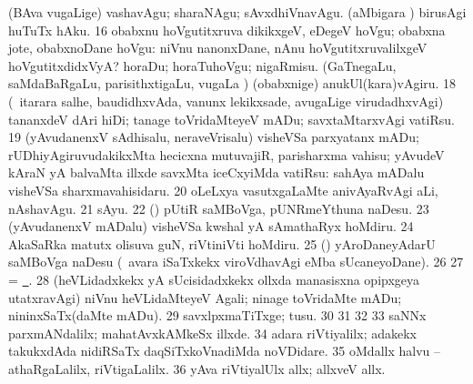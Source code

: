 { (BAva \mo vugaLige) vashavAgu; sharaNAgu; sAvxdhiVnavAgu. 
 (aMbigara \vi) birusAgi huTuTx hAku. 
\eanum
\numie
\num{16}  obabxnu hoVgutitxruva dikikxgeV, eDegeV hoVgu; obabxna jote, obabxnoDane hoVgu:  niVnu nanonxDane, nAnu hoVgutitxruvalilxgeV hoVgutitxdidxVyA? 
  
\banum
{} horaDu; horaTuhoVgu; nigaRmisu. 
 (GaTnegaLu, saMdaBaRgaLu, parisithxtigaLu, \mo vugaLa \vi) (obabxnige) anukUl(kara)vAgiru. 
\eanum
\numie
\num{18}  (\kanmu\ itarara salhe, baudidhxvAda, \mo vanunx lekikxsade, avugaLige virudadhxvAgi) tananxdeV dAri hiDi; tanage toVridaMteyeV mADu; savxtaMtarxvAgi vatiRsu. 
\num{19}  (yAvudanenxV sAdhisalu, neraveVrisalu) visheVSa parxyatanx mADu; rUDhiyAgiruvudakikxMta hecicxna mutuvajiR, parisharxma vahisu; yAvudeV kAraN yA balvaMta illxde savxMta iceCxyiMda vatiRsu:  sahAya mADalu visheVSa sharxmavahisidaru. 
\num{20}  oLeLxya vasutxgaLaMte anivAyaRvAgi aLi, nAshavAgu. 
\num{21}  sAyu. 
\num{22}  (\AmA) pUtiR saMBoVga, pUNRmeYthuna naDesu. 
\num{23}  (yAvudanenxV mADalu) visheVSa kwshal yA sAmathaRyx hoMdiru. 
\num{24}  AkaSaRka matutx olisuva guN, riVtiniVti hoMdiru. 
\num{25}  (\hA) yAroDaneyAdarU saMBoVga naDesu (\kanmu\ avara iSaTxkekx viroVdhavAgi eMba sUcaneyoDane). 
\num{26}  
\num{27}  = \hyperlink{way pagu13}{\pagu\ }. 
\num{28}  (heVLidadxkekx yA sUcisidadxkekx ollxda manasisxna opipxgeya utatxravAgi) niVnu heVLidaMteyeV Agali; ninage toVridaMte mADu; nininxSaTx(daMte mADu). 
\num{29}  savxlpxmaTiTxge; tusu. 
\num{30}  
\num{31}  
\num{32}  
\num{33}  saNNx parxmANdalilx; mahatAvxkAMkeSx illxde. 
\num{34}  adara riVtiyalilx; adakekx takukxdAda nidiRSaTx daqSiTxkoVnadiMda noVDidare. 
\num{35}  oMdallx halvu -- athaRgaLalilx, riVtigaLalilx. 
\num{36}  yAva riVtiyalUlx allx; allxveV allx. 
}

